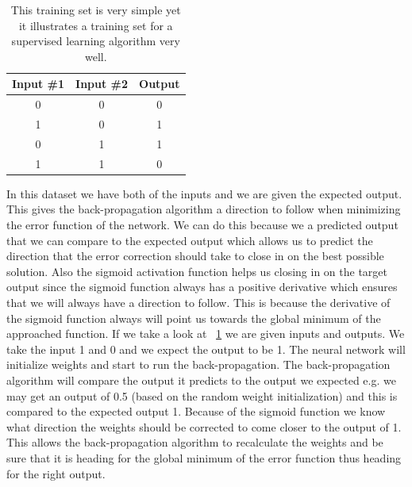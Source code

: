 \begin{table}[!ht]
\centering  %
\begin{tabular}{c c c} %
Input \#1 & Input \#2 & Output \\ [0.5ex] %
\hline                  %
0 & 0 & 0  \\ %
1 & 0 & 1  \\
0 & 1 & 1  \\
1 & 1 & 0 \\ [1ex] %
\hline %
\end{tabular}
\caption{This training set is very simple yet it illustrates a training set for a supervised learning algorithm very well.} %
\label{table:xor-table} %
\end{table}

In this dataset we have both of the inputs and we are given the expected output. This gives the back-propagation algorithm a direction to follow when minimizing the error function of the network. We can do this because we a predicted output that we can compare to the expected output which allows us to predict the direction that the error correction should take to close in on the best possible solution. Also the sigmoid activation function helps us closing in on the target output since the sigmoid function always has a positive derivative which ensures that we will always have a direction to follow\cite[p. 153]{rojas1996neural}. This is because the derivative of the sigmoid function always will point us towards the global minimum of the approached function. If we take a look at ~\ref{table:xor-table} we are given inputs and outputs. We take the input 1 and 0 and we expect the output to be 1. The neural network will initialize weights and start to run the back-propagation. The back-propagation algorithm will compare the output it predicts to the output we expected e.g. we may get an output of 0.5 (based on the random weight initialization) and this is compared to the expected output 1. Because of the sigmoid function we know what direction the weights should be corrected to come closer to the output of 1. This allows the back-propagation algorithm to recalculate the weights and be sure that it is heading for the global minimum of the error function thus heading for the right output.

